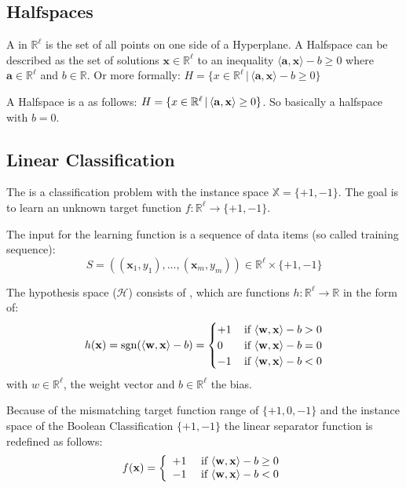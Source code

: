 \subsection{Halfspaces}
A  in $\mathbb{R}^{\ell}$ is the set of all points on one side of a Hyperplane. A Halfspace can be described as the set of solutions $\mathbf{x} \in \mathbb{R}^\ell$ to an inequality $\langle\mathbf{a}, \mathbf{x}\rangle - b \geq 0$ where $\mathbf{a} \in \mathbb{R}^\ell$ and $b \in \mathbb{R}$. Or more formally: $H = \{x \in \mathbb{R}^\ell \, | \, \langle\mathbf{a}, \mathbf{x}\rangle - b \geq 0\}$

A Halfspace is a  as follows: $H = \{x \in \mathbb{R}^\ell \, | \, \langle\mathbf{a}, \mathbf{x}\rangle \geq 0\}$. So basically a halfspace with $b = 0$.

\subsection{Linear Classification}
The  is a classification problem with the instance space $\mathbb{X} = \{+1,-1\}$. The goal is to learn an unknown target function $f:\mathbb{R}^\ell \rightarrow \{+1,-1\}$.

The input for the learning function is a sequence of data items (so called training sequence):
\begin{equation}
S=((\mathbf{x}_{1}, y_{1}), \ldots,(\mathbf{x}_{m}, y_{m})) \in \mathbb{R}^{\ell} \times\{+1,-1\}
\end{equation}

The hypothesis space ($\mathcal{H}$) consists of , which are functions $h:\mathbb{R}^\ell \rightarrow \mathbb{R}$ in the form of:
\begin{equation} 
h(\mathbf{x})=\operatorname{sgn}(\langle\mathbf{w}, \mathbf{x}\rangle- b)=
\begin{cases}
+1 & \, \text {if }\langle\mathbf{w}, \mathbf{x}\rangle - b>0 \\
0 & \,\text {if }\langle\mathbf{w}, \mathbf{x}\rangle - b=0 \\
-1 & \,\text {if }\langle\mathbf{w}, \mathbf{x}\rangle - b<0
\end{cases}
\end{equation}
with $w \in \mathbb{R}^\ell$, the weight vector and $b\in \mathbb{R}^\ell$ the bias.

Because of the mismatching target function range of $\{+1,0,-1\}$ and the instance space of the Boolean Classification $\{+1,-1\}$ the linear separator function is redefined as follows:
\begin{equation}
f(\mathbf{x})=\left\{\begin{array}{ll}{+1} & {\text { if } \langle\mathbf{w}, \mathbf{x}\rangle - b \geq 0} \\ {-1} & {\text { if }\langle\mathbf{w}, \mathbf{x}\rangle - b<0}\end{array}\right.
\end{equation}

